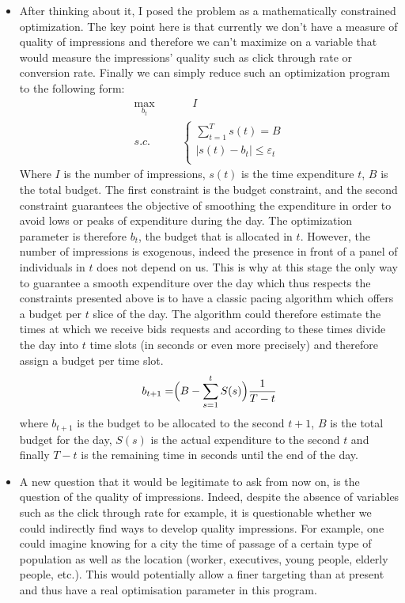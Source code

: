 \documentclass[12pt]{article}
\begin{document}
\begin{itemize}
\item After thinking about it, I posed the problem as a mathematically constrained optimization. The key point here is that currently we don't have a measure of quality of impressions and therefore we can't maximize on a variable that would measure the impressions' quality such as click through rate or conversion rate. Finally we can simply reduce such an optimization program to the following form:
\begin{align*}
\max_{b_t} &\quad I \\
s.c.  \qquad & 
\left\{
	\begin{array}{ll} 
		\displaystyle \sum_{t=1}^{T} s(t) = B\\
		|s(t) - b_t | \leq \varepsilon_t\\
	\end{array}
\right.
\end{align*}
Where $I$ is the number of impressions, $s(t)$ is the time expenditure $t$, $B$ is the total budget. The first constraint is the budget constraint, and the second constraint guarantees the objective of smoothing the expenditure in order to avoid lows or peaks of expenditure during the day. The optimization parameter is therefore $b_t$, the budget that is allocated in $t$. However, the number of impressions is exogenous, indeed the presence in front of a panel of individuals in $t$ does not depend on us. This is why at this stage the only way to guarantee a smooth expenditure over the day which thus respects the constraints presented above is to have a classic pacing algorithm which offers a budget per $t$ slice of the day. The algorithm could therefore estimate the times at which we receive bids requests and according to these times divide the day into $t$ time slots (in seconds or even more precisely) and therefore assign a budget per time slot. 
$$b_{t+1} = \Bigr(B - \displaystyle \sum_{s=1}^{t} S(s)\Bigl) \dfrac{1}{T-t}$$
where $b_{t+1}$ is the budget to be allocated to the second $t+1$, $B$ is the total budget for the day, $S(s)$ is the actual expenditure to the second $t$ and finally $T-t$ is the remaining time in seconds until the end of the day.  
\item A new question that it would be legitimate to ask from now on, is the question of the quality of impressions. Indeed, despite the absence of variables such as the click through rate for example, it is questionable whether we could indirectly find ways to develop quality impressions. For example, one could imagine knowing for a city the time of passage of a certain type of population as well as the location (worker, executives, young people, elderly people, etc.). This would potentially allow a finer targeting than at present and thus have a real optimisation parameter in this program.

\end{itemize}
\end{document}
